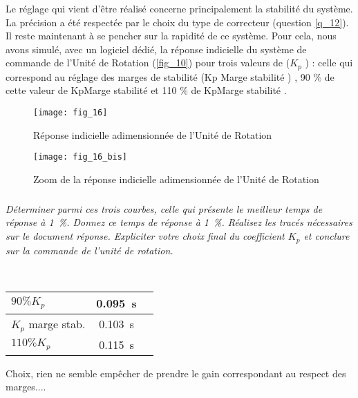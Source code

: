 Le réglage qui vient d’être réalisé concerne principalement la stabilité du système. La précision a été respectée
par le choix du type de correcteur (question \ref{q_12}). Il reste maintenant à se
pencher sur la rapidité de ce système.
Pour cela, nous avons simulé, avec un
logiciel dédié, la réponse indicielle du
système de commande de l’Unité de
Rotation (\autoref{fig_10}) pour trois valeurs de
($K_p$ ) : celle qui correspond au réglage des marges de stabilité
(Kp Marge stabilité ) , 90 \% de cette valeur
de KpMarge stabilité et 110 \% de
KpMarge stabilité .

\begin{minipage}[c]{.47\linewidth}
\begin{figure}[H]
\centering
\texttt{[image: fig\_16]}
\caption{\label{fig_16}Réponse indicielle adimensionnée de l’Unité de Rotation}
\end{figure}
\end{minipage}\hfill
\begin{minipage}[c]{.47\linewidth}
\begin{figure}[H]
\centering
\texttt{[image: fig\_16\_bis]}
\caption{\label{fig_16b} Zoom de la réponse indicielle adimensionnée de l’Unité de Rotation}
\end{figure}
\end{minipage}
\fi

\subparagraph{\label{q_14}}\textit{Déterminer parmi ces trois courbes, celle qui présente le meilleur temps de réponse à \SI{1}{\%}. Donnez ce temps de réponse à \SI{1}{\%}. Réalisez les tracés nécessaires sur le document réponse.
Expliciter votre choix final du coefficient $K_p$ et conclure sur la commande de l’unité de rotation.}
\ifprof
\begin{corrige} ~\\
\begin{center}
\begin{tabular}{lcc}
\hline
$90\% K_p$ & \SI{0,095}{s} & \\ \hline
$K_p$ marge stab. &  \SI{0,103}{s}& \\ \hline
$110\% K_p$ & \SI{0,115}{s} & \\ \hline
\end{tabular}
\end{center}

Choix, rien ne semble empêcher de prendre le gain correspondant au respect des marges....
\end{corrige}
\else
\fi


